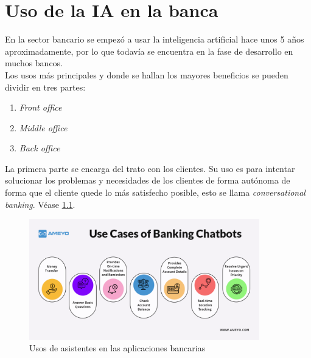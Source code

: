 \documentclass[12pt, a4paper]{report}
\begin{document}
\chapter{Uso de la IA en la banca}
En la sector bancario se empezó a usar la inteligencia artificial hace unos 5 años aproximadamente, por lo que todavía se encuentra en la fase de desarrollo en muchos bancos.\\
Los usos más principales y donde se hallan los mayores beneficios se pueden dividir en tres partes:
\begin{enumerate}
	\item \textit{Front office}
	\item \textit{Middle office}
	\item \textit{Back office}
\end{enumerate}

La primera parte se encarga del trato con los clientes. Su uso es para intentar solucionar los problemas y necesidades de los clientes de forma autónoma de forma que el cliente quede lo más satisfecho posible, esto se llama \textit{conversational banking}. Véase \ref{chatbot}.
\newline
\begin{figure}[H]
	\centering
	\includegraphics[width=100mm]{usoschatbot}
	\caption{Usos de asistentes en las aplicaciones bancarias}
	\label{chatbot}
\end{figure}
\end{document}
